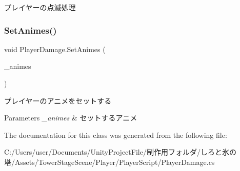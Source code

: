 プレイヤーの点滅処理 

\mbox{\label{class_player_damage_a445cc91819e5c5397ac1f992ea9f471b}} 
\subsubsection{\texorpdfstring{Set\+Animes()}{SetAnimes()}}
{\footnotesize\ttfamily void Player\+Damage.\+Set\+Animes (\begin{DoxyParamCaption}\item[{\hyperlink{class_player_animation}{Player\+Animation}}]{\+\_\+animes }\end{DoxyParamCaption})\hspace{0.3cm}{\ttfamily [inline]}}



プレイヤーのアニメをセットする 


\begin{DoxyParams}{Parameters}
{\em \+\_\+animes} & セットするアニメ\\
\hline
\end{DoxyParams}


The documentation for this class was generated from the following file\+:\begin{DoxyCompactItemize}
\item 
C\+:/\+Users/user/\+Documents/\+Unity\+Project\+File/制作用フォルダ/しろと氷の塔/\+Assets/\+Tower\+Stage\+Scene/\+Player/\+Player\+Script/Player\+Damage.\+cs\end{DoxyCompactItemize}
